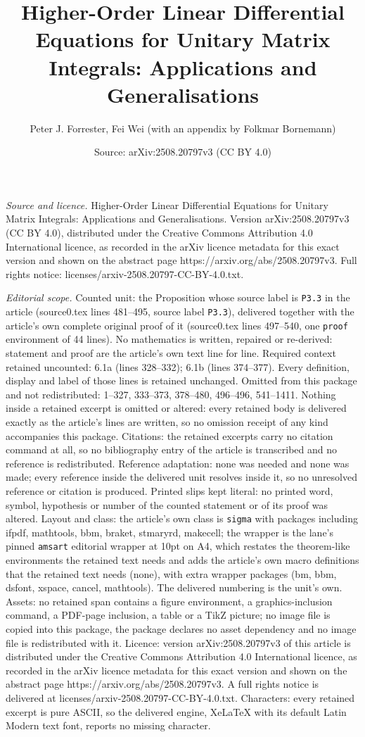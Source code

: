 \documentclass[10pt,a4paper]{amsart}
\title[Higher-Order Linear Differential Equations for Unitary Matri]{Higher-Order Linear Differential Equations for Unitary Matrix Integrals: Applications and Generalisations}
\author{Peter J. Forrester, Fei Wei (with an appendix by Folkmar Bornemann)}
\date{Source: arXiv:2508.20797v3 (CC BY 4.0)}
\begin{document}
\maketitle

\noindent\emph{Source and licence.} Higher-Order Linear Differential Equations for Unitary Matrix Integrals: Applications and Generalisations. Version arXiv:2508.20797v3 (CC BY 4.0), distributed under the Creative Commons Attribution 4.0 International licence, as recorded in the arXiv licence metadata for this exact version and shown on the abstract page https://arxiv.org/abs/2508.20797v3. Full rights notice: licenses/arxiv-2508.20797-CC-BY-4.0.txt.\par\smallskip

\noindent\textit{Editorial scope.} Counted unit: the Proposition whose source label is \texttt{P3.3} in the article (source0.tex lines 481--495, source label \texttt{P3.3}), delivered together with the article's own complete original proof of it (source0.tex lines 497--540, one \texttt{proof} environment of 44 lines). No mathematics is written, repaired or re-derived: statement and proof are the article's own text line for line. Required context retained uncounted: 6.1a (lines 328--332); 6.1b (lines 374--377). Every definition, display and label of those lines is retained unchanged. Omitted from this package and not redistributed: 1--327, 333--373, 378--480, 496--496, 541--1411. Nothing inside a retained excerpt is omitted or altered: every retained body is delivered exactly as the article's lines are written, so no omission receipt of any kind accompanies this package. Citations: the retained excerpts carry no citation command at all, so no bibliography entry of the article is transcribed and no reference is redistributed. Reference adaptation: none was needed and none was made; every reference inside the delivered unit resolves inside it, so no unresolved reference or citation is produced. Printed slips kept literal: no printed word, symbol, hypothesis or number of the counted statement or of its proof was altered. Layout and class: the article's own class is \texttt{sigma} with packages including ifpdf, mathtools, bbm, braket, stmaryrd, makecell; the wrapper is the lane's pinned \texttt{amsart} editorial wrapper at 10pt on A4, which restates the theorem-like environments the retained text needs and adds the article's own macro definitions that the retained text needs (none), with extra wrapper packages (bm, bbm, dsfont, xspace, cancel, mathtools). The delivered numbering is the unit's own. Assets: no retained span contains a figure environment, a graphics-inclusion command, a PDF-page inclusion, a table or a TikZ picture; no image file is copied into this package, the package declares no asset dependency and no image file is redistributed with it. Licence: version arXiv:2508.20797v3 of this article is distributed under the Creative Commons Attribution 4.0 International licence, as recorded in the arXiv licence metadata for this exact version and shown on the abstract page https://arxiv.org/abs/2508.20797v3. A full rights notice is delivered at licenses/arxiv-2508.20797-CC-BY-4.0.txt. Characters: every retained excerpt is pure ASCII, so the delivered engine, XeLaTeX with its default Latin Modern text font, reports no missing character.
\end{document}
